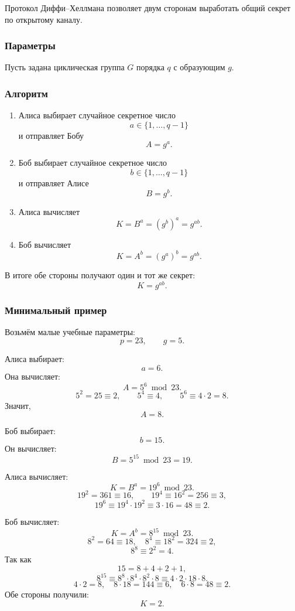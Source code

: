 \documentclass[12pt,a4paper]{article}
\begin{document}
Протокол Диффи--Хеллмана позволяет двум сторонам выработать общий секрет по открытому каналу.

\subsubsection*{Параметры}

Пусть задана циклическая группа $G$ порядка $q$ с образующим $g$.

\subsubsection*{Алгоритм}

\begin{enumerate}
    \item Алиса выбирает случайное секретное число
    \[
        a\in \{1,\ldots,q-1\}
    \]
    и отправляет Бобу
    \[
        A=g^a.
    \]
    \item Боб выбирает случайное секретное число
    \[
        b\in \{1,\ldots,q-1\}
    \]
    и отправляет Алисе
    \[
        B=g^b.
    \]
    \item Алиса вычисляет
    \[
        K=B^a=(g^b)^a=g^{ab}.
    \]
    \item Боб вычисляет
    \[
        K=A^b=(g^a)^b=g^{ab}.
    \]
\end{enumerate}

В итоге обе стороны получают один и тот же секрет:
\[
    K=g^{ab}.
\]

\subsubsection*{Минимальный пример}

Возьмём малые учебные параметры:
\[
    p=23,\qquad g=5.
\]

Алиса выбирает:
\[
    a=6.
\]
Она вычисляет:
\[
    A=5^6\bmod 23.
\]
\[
    5^2=25\equiv 2,\qquad 5^4\equiv 4,\qquad 5^6\equiv 4\cdot 2=8.
\]
Значит,
\[
    A=8.
\]

Боб выбирает:
\[
    b=15.
\]
Он вычисляет:
\[
    B=5^{15}\bmod 23=19.
\]

Алиса вычисляет:
\[
    K=B^a=19^6\bmod 23.
\]
\[
    19^2=361\equiv 16,\qquad 19^4\equiv 16^2=256\equiv 3,
\]
\[
    19^6\equiv 19^4\cdot 19^2\equiv 3\cdot 16=48\equiv 2.
\]

Боб вычисляет:
\[
    K=A^b=8^{15}\bmod 23.
\]
\[
    8^2=64\equiv 18,\quad
    8^4\equiv 18^2=324\equiv 2,
\]
\[
    8^8\equiv 2^2=4.
\]
Так как
\[
    15=8+4+2+1,
\]
\[
    8^{15}\equiv 8^8\cdot 8^4\cdot 8^2\cdot 8
    \equiv 4\cdot 2\cdot 18\cdot 8.
\]
\[
    4\cdot 2=8,\quad 8\cdot 18=144\equiv 6,\quad 6\cdot 8=48\equiv 2.
\]
Обе стороны получили:
\[
    K=2.
\]
\end{document}
